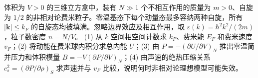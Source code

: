 体积为 \(V>0\) 的三维立方盒中，装有 \(N\gg1\) 个不相互作用的质量为 \(m>0\)、自旋为 \(1/2\) 的非相对论费米粒子。零温基态下每个动量态最多容纳两种自旋，所有 \(|\boldsymbol k|\le k_F\) 的自旋态均被填满。忽略边界效应及相互作用，取 \(\varepsilon(k)=\hbar^2k^2/(2m)\)，粒子数密度 \(n=N/V\)。
(1) 从 \(k\) 空间相空间计数求 \(k_F\)、费米能 \(E_F\) 和费米速度 \(v_F\)；(2) 将动能在费米球内积分求总内能 \(U\)；(3) 由 \(P=-(\partial U/\partial V)_N\) 推出零温简并压力和体积模量 \(B=-V(\partial P/\partial V)_N\)；(4) 由声速的绝热压缩关系 \(c_s^2=(\partial P/\partial\rho)_S\) 求声速并与 \(v_F\) 比较，说明何时非相对论理想模型可能失效。

